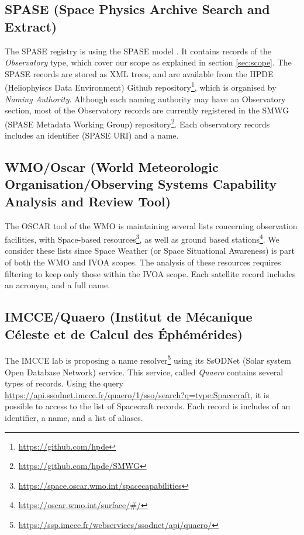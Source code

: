 \documentclass[11pt,a4paper]{ivoa}
\begin{document}
\subsection{SPASE (Space Physics Archive Search and Extract)}
The SPASE registry is using the SPASE model \citep{Roberts:2018bi}.
It contains records of the \emph{Observatory} type, which cover our
scope as explained in section \ref{sec:scope}. The SPASE records
are stored as XML trees, and are available from the HPDE (Heliophyiscs
Data Environment) Github repository\footnote{\url{https://github.com/hpde}},
which is organised by \emph{Naming Authority}. Although each naming
authority may have an Observatory section, most of the Observatory
records are currently registered in the SMWG (SPASE Metadata Working
Group) repository\footnote{\url{https://github.com/hpde/SMWG}}.
Each observatory records includes an identifier (SPASE URI) and a name.

\subsection{WMO/Oscar (World Meteorologic Organisation/Observing Systems Capability Analysis and Review Tool)}
The OSCAR tool of the WMO is maintaining several lists concerning
observation facilities, with Space-based resources\footnote{\url{https://space.oscar.wmo.int/spacecapabilities}},
as well as ground based stations\footnote{\url{https://oscar.wmo.int/surface/\#/}}.
We consider these lists since Space Weather (or Space Situational
Awareness) is part of both the WMO and IVOA scopes. The analysis of these
resources requires filtering to keep only those within the IVOA scope.
Each satellite record includes an acronym, and a full name.

\subsection{IMCCE/Quaero (Institut de M\'ecanique C\'eleste et de Calcul des \'Eph\'em\'erides)}
The IMCCE lab is proposing a name resolver\footnote{\url{https://ssp.imcce.fr/webservices/ssodnet/api/quaero/}}
using its SsODNet (Solar system Open Database Network) service. This
service, called \emph{Quaero} contains several types of records. Using
the query \url{https://api.ssodnet.imcce.fr/quaero/1/sso/search?q=type:Spacecraft},
it is possible to access to the list of Spacecraft records. Each
record is includes of an identifier, a name, and a list of
aliases.
\end{document}

